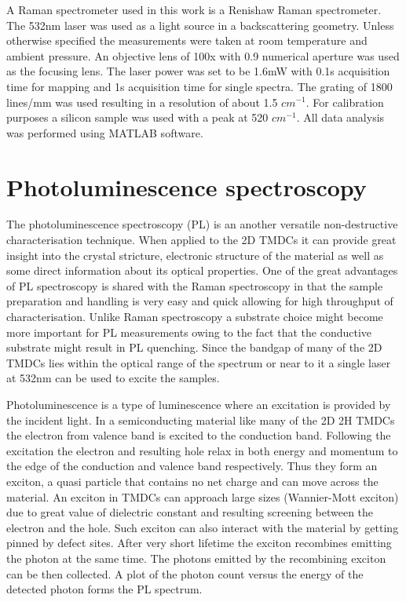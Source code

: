 A Raman spectrometer used in this work is a Renishaw Raman spectrometer. The 532nm laser was used as a light source in a backscattering geometry. Unless otherwise specified the measurements were taken at room temperature and ambient pressure. An objective lens of 100x with 0.9 numerical aperture was used as the focusing lens. The laser power was set to be 1.6mW with 0.1s acquisition time for mapping and 1s acquisition time for single spectra. The grating of 1800 lines/mm was used resulting in a resolution of about 1.5 $cm^{-1}$. For calibration purposes a silicon sample was used with a peak at 520 $cm^{-1}$. All data analysis was performed using MATLAB software.

\section{Photoluminescence spectroscopy}

The photoluminescence spectroscopy (PL) is an another versatile non-destructive characterisation technique. When applied to the 2D TMDCs it can provide great insight into the crystal stricture, electronic structure of the material as well as some direct information about its optical properties. One of the great advantages of PL spectroscopy is shared with the Raman spectroscopy in that the sample preparation and handling is very easy and quick allowing for high throughput of characterisation. Unlike Raman spectroscopy a substrate choice might become more important for PL measurements owing to the fact that the conductive substrate might result in PL quenching. Since the bandgap of many of the 2D TMDCs lies within the optical range of the spectrum or near to it a single laser at 532nm can be used to excite the samples.

Photoluminescence is a type of luminescence where an excitation is provided by the incident light. In a semiconducting material like many of the 2D 2H TMDCs the electron from valence band is excited to the conduction band. Following the excitation the electron and resulting hole relax in both energy and momentum to the edge of the conduction and valence band respectively. Thus they form an exciton, a quasi particle that contains no net charge and can move across the material. An exciton in TMDCs can approach large sizes (Wannier-Mott exciton) due to great value of dielectric constant and resulting screening between the electron and the hole. Such exciton can also interact with the material by getting pinned by defect sites. After very short lifetime the exciton recombines emitting the photon at the same time. The photons emitted by the recombining exciton can be then collected. A plot of the photon count versus the energy of the detected photon forms the PL spectrum.

